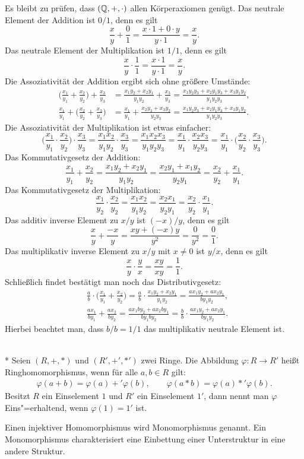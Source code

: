 Es bleibt zu prüfen, dass $(\mathbb Q,+,\cdot)$ allen Körperaxiomen genügt.
Das neutrale Element der Addition ist $0/1$, denn es gilt
\[\frac{x}{y}+\frac{0}{1} = \frac{x\cdot 1+0\cdot y}{y\cdot 1} = \frac{x}{y}.\]
Das neutrale Element der Multiplikation ist $1/1$, denn es gilt
\[\frac{x}{y}\cdot\frac{1}{1} = \frac{x\cdot 1}{y\cdot 1} = \frac{x}{y}.\]
Die Assoziativität der Addition ergibt sich ohne größere Umstände:
\begin{align*}
\bigg(\frac{x_1}{y_1}+\frac{x_2}{y_2}\bigg)+\frac{x_3}{y_3}
&= \frac{x_1y_2+x_2y_1}{y_1y_2} + \frac{x_3}{y_3}
= \frac{x_1y_2y_3+x_2y_1y_3+x_3y_1y_2}{y_1y_2y_3},\\
\frac{x_1}{y_1}+\bigg(\frac{x_2}{y_2}+\frac{x_3}{y_3}\bigg)
&= \frac{x_1}{y_1}+\frac{x_2y_3+x_3y_2}{y_2y_3}
= \frac{x_1y_2y_3+x_2y_1y_3+x_3y_1y_2}{y_1y_2y_3}.
\end{align*}
Die Assoziativität der Multiplikation ist etwas einfacher:
\[\bigg(\frac{x_1}{y_1}\cdot\frac{x_2}{y_2}\bigg)\cdot\frac{x_3}{y_3}
= \frac{x_1x_2}{y_1y_2}\cdot\frac{x_3}{y_3} = \frac{x_1x_2x_3}{y_1y_2y_3}
= \frac{x_1}{y_1}\cdot\frac{x_2x_3}{y_2y_3}
= \frac{x_1}{y_1}\cdot\bigg(\frac{x_2}{y_2}\cdot\frac{x_3}{y_3}\bigg).\]
Das Kommutativgesetz der Addition:
\[\frac{x_1}{y_1}+\frac{x_2}{y_2} = \frac{x_1y_2+x_2y_1}{y_1y_2}
= \frac{x_2y_1+x_1y_2}{y_2y_1}
= \frac{x_2}{y_2}+\frac{x_1}{y_1}.\]
Das Kommutativgesetz der Multiplikation:
\[\frac{x_1}{y_2}\cdot\frac{x_2}{y_2}
= \frac{x_1x_2}{y_1y_2} = \frac{x_2x_1}{y_2y_1}
= \frac{x_2}{y_2}\cdot\frac{x_1}{y_1}.\]
Das additiv inverse Element zu $x/y$ ist $(-x)/y$, denn es gilt
\[\frac{x}{y}+\frac{-x}{y} = \frac{xy+(-x)y}{y^2}
= \frac{0}{y^2} = \frac{0}{1}.\]
Das multiplikativ inverse Element zu $x/y$ mit $x\ne 0$
ist $y/x$, denn es gilt
\[\frac{x}{y}\cdot\frac{y}{x} = \frac{xy}{xy} = \frac{1}{1}.\]
Schließlich findet bestätigt man noch das Distributivgesetz:
\begin{align*}
&\frac{a}{b}\cdot\bigg(\frac{x_1}{y_1}+\frac{x_2}{y_2}\bigg)
= \frac{a}{b}\cdot\frac{x_1y_2+x_2y_1}{y_1y_2}
= \frac{ax_1y_2+ax_2y_1}{by_1y_2},\\
&\frac{ax_1}{by_1}+\frac{ax_2}{by_2}
= \frac{ax_1by_2+ax_2by_1}{by_1by_2}
= \frac{b}{b}\cdot\frac{ax_1y_2+ax_2y_1}{by_1y_2}.
\end{align*}
Hierbei beachtet man, dass $b/b=1/1$ das multiplikativ
neutrale Element ist.\;\qedsymbol

\begin{Definition}[Ringhomomorphismus]\mbox{}\\*
Seien $(R,+,*)$ und $(R',+',*')$ zwei Ringe. Die Abbildung
$\varphi\colon R\to R'$ heißt Ringhomomorphismus, wenn für alle
$a,b\in R$ gilt:
\begin{align*}
\varphi(a+b) = \varphi(a)+'\varphi(b),\qquad
\varphi(a*b) = \varphi(a)*'\varphi(b).
\end{align*}
Besitzt $R$ ein Einselement $1$ und $R'$ ein Einselement $1'$,
dann nennt man $\varphi$ Eins"=erhaltend, wenn $\varphi(1)=1'$ ist.
\end{Definition}
Einen injektiver Homomorphismus wird Monomorphismus genannt. Ein
Monomorphismus charakterisiert eine Einbettung einer Unterstruktur
in eine andere Struktur.

